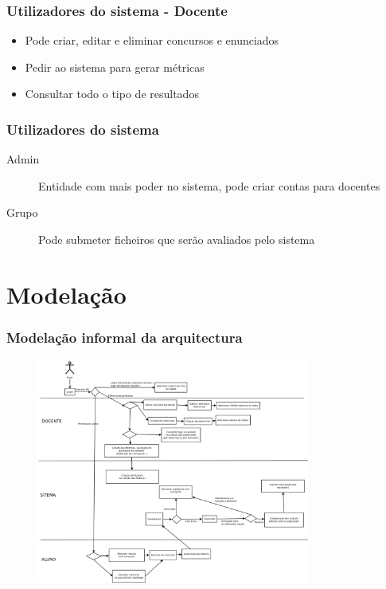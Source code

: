 \documentclass{beamer}
\begin{document}
\begin{frame} \frametitle{Utilizadores do sistema - Docente}
\begin{itemize}
\item Pode criar, editar e eliminar concursos e enunciados
\item Pedir ao sistema para gerar métricas
\item Consultar todo o tipo de resultados
\end{itemize}
\end{frame}

\begin{frame} \frametitle{Utilizadores do sistema}
\begin{description}
\item[Admin] Entidade com mais poder no sistema, pode criar contas para docentes
\item[Grupo] Pode submeter ficheiros que serão avaliados pelo sistema
\end{description}
\end{frame}

\section{Modelação}
\begin{frame} \frametitle{Modelação informal da arquitectura}
\begin{figure}[htbp]
\begin{center}
\includegraphics[width=0.8\textwidth]{../report1/Images/EL-PI}
\end{center}
\end{figure}
\end{frame}

\newcommand{\rarrow}{\rightarrow}
\newcommand{\larrow}{\leftarrow}
\newcommand{\unif}{\sim}
\def\prop#1#2#3{\noindent\\\begin{array}{l} \{#1\} \\ #2 \\ \{#3\} \\ \end{array}\\\\}
\end{document}

